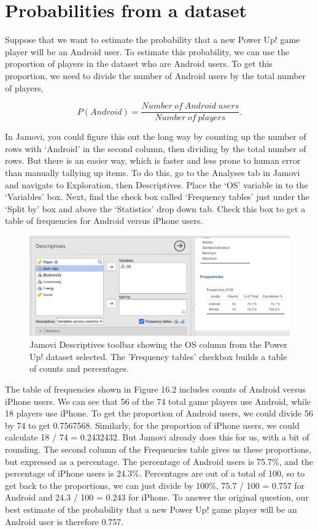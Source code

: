 \documentclass[
]{scrbook}
\begin{document}
\hypertarget{probabilities-from-a-dataset}{%
\section{Probabilities from a dataset}\label{probabilities-from-a-dataset}}

Suppose that we want to estimate the probability that a new Power Up! game player will be an Android user.
To estimate this probability, we can use the proportion of players in the dataset who are Android users.
To get this proportion, we need to divide the number of Android users by the total number of players,

\[P(Android) = \frac{Number\:of\:Android\:users}{Number\:of\:players}.\]

In Jamovi, you could figure this out the long way by counting up the number of rows with `Android' in the second column, then dividing by the total number of rows.
But there is an easier way, which is faster and less prone to human error than manually tallying up items.
To do this, go to the Analyses tab in Jamovi and navigate to Exploration, then Descriptives.
Place the `OS' variable in to the `Variables' box.
Next, find the check box called `Frequency tables' just under the `Split by' box and above the `Statistics' drop down tab.
Check this box to get a table of frequencies for Android versus iPhone users.

\begin{figure}
\includegraphics[width=1\linewidth]{img/jamovi_power_up_frequencies} \caption{Jamovi Descriptives toolbar showing the OS column from the Power Up! dataset selected. The 'Frequency tables' checkbox builds a table of counts and percentages.}\label{fig:unnamed-chunk-67}
\end{figure}

The table of frequencies shown in Figure 16.2 includes counts of Android versus iPhone users.
We can see that 56 of the 74 total game players use Android, while 18 players use iPhone.
To get the proportion of Android users, we could divide 56 by 74 to get 0.7567568.
Similarly, for the proportion of iPhone users, we could calculate 18 / 74 = 0.2432432.
But Jamovi already does this for us, with a bit of rounding.
The second column of the Frequencies table gives us these proportions, but expressed as a percentage.
The percentage of Android users is 75.7\%, and the percentage of iPhone users is 24.3\%.
Percentages are out of a total of 100, so to get back to the proportions, we can just divide by 100\%, 75.7 / 100 = 0.757 for Android and 24.3 / 100 = 0.243 for iPhone.
To answer the original question, our best estimate of the probability that a new Power Up! game player will be an Android user is therefore 0.757.
\end{document}
